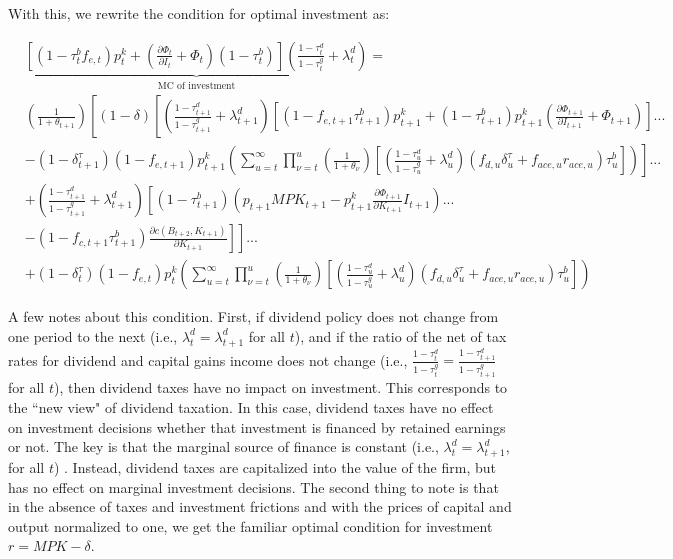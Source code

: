 With this, we rewrite the condition for optimal investment as: 

\begin{equation}
\begin{split}
&\underbrace{ \left[(1-\tau^{b}_{t}f_{e,t})p^{k}_{t} + \left(\frac{\partial \Phi_{t}}{\partial I_{t}} + \Phi_{t}\right)(1-\tau^{b}_{t})\right]\left(\frac{1-\tau^{d}_{t}}{1-\tau^{g}_{t}} + \lambda^{d}_{t}\right)}_{\text{MC of investment}} = \\
& \left(\frac{1}{1+\theta_{t+1}}\right)\left[(1-\delta)\left[\left(\frac{1-\tau^{d}_{t+1}}{1-\tau^{g}_{t+1}} + \lambda^{d}_{t+1}\right)\left[(1-f_{e,t+1}\tau^{b}_{t+1})p^{k}_{t+1}+ (1-\tau^{b}_{t+1})p^{k}_{t+1}\left(\frac{\partial \Phi_{t+1}}{\partial I_{t+1}} + \Phi_{t+1}\right)\right]...\right.\right. \\
& \left.\left.  -  (1-\delta^{\tau}_{t+1})(1-f_{e,t+1})p^{k}_{t+1}\left(\sum_{u=t}^{\infty} \prod_{\nu=t}^{u}\left(\frac{1}{1+\theta_{\nu}}\right)\left[\left(\frac{1-\tau^{d}_{u}}{1-\tau^{g}_{u}}+\lambda^{d}_{u}\right)\left( f_{d,u}\delta^{\tau}_{u}+f_{ace,u}r_{ace,u} \right)\tau^{b}_{u}\right]\right)\right]... \right. \\
& \left. +  \left(\frac{1-\tau^{d}_{t+1}}{1-\tau^{g}_{t+1}} + \lambda^{d}_{t+1} \right)\left[(1-\tau^{b}_{t+1})\left(p_{t+1}MPK_{t+1}- p^{k}_{t+1}\frac{\partial \Phi_{t+1}}{\partial K_{t+1}}I_{t+1}\right)  ... \right.\right. \\
& \left.\left.-(1-f_{c,t+1}\tau^{b}_{t+1}) \frac{\partial c(B_{t+2},K_{t+1})}{\partial K_{t+1}} \right] \right] ...\\
&  + (1-\delta^{\tau}_{t})(1-f_{e,t})p^{k}_{t}\left(\sum_{u=t}^{\infty} \prod_{\nu=t}^{u}\left(\frac{1}{1+\theta_{\nu}}\right)\left[\left(\frac{1-\tau^{d}_{u}}{1-\tau^{g}_{u}}+\lambda^{d}_{u}\right)\left( f_{d,u}\delta^{\tau}_{u}+f_{ace,u}r_{ace,u} \right)\tau^{b}_{u}\right]\right)
\end{split}
\end{equation}

A few notes about this condition.  First, if dividend policy does not change from one period to the next (i.e., $\lambda^{d}_{t}=\lambda^{d}_{t+1}$ for all $t$), and if the ratio of the net of tax rates for dividend and capital gains income does not change (i.e., $\frac{1-\tau^{d}_{t}}{1-\tau^{g}_{t}}=\frac{1-\tau^{d}_{t+1}}{1-\tau^{g}_{t+1}}$ for all $t$), then dividend taxes have no impact on investment.  This corresponds to the ``new view" of dividend taxation.  In this case, dividend taxes have no effect on investment decisions whether that investment is financed by retained earnings or not.  The key is that the marginal source of finance is constant (i.e., $\lambda^{d}_{t}=\lambda^{d}_{t+1}$, for all $t$) .  Instead, dividend taxes are capitalized into the value of the firm, but has no effect on marginal investment decisions.  The second thing to note is that in the absence of taxes and investment frictions and with the prices of capital and output normalized to one, we get the familiar optimal condition for investment  $r=MPK-\delta$.

